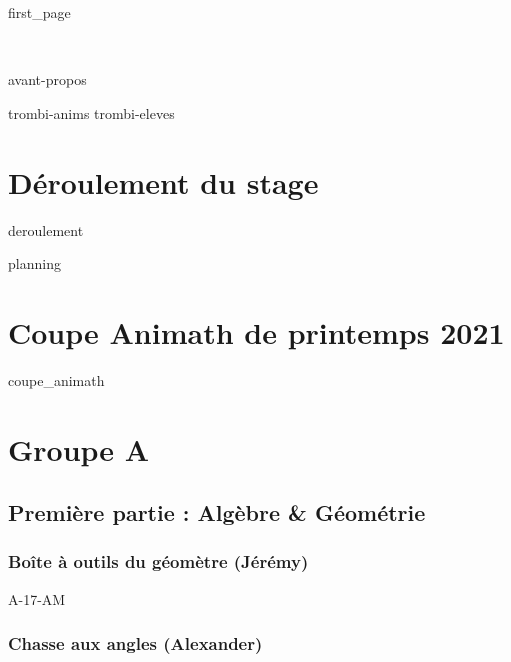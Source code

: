 \documentclass[poly,trombi]{valbonne}
\begin{document}
{first_page}

\pagestyle{empty}~

\pagebreak

\clearpage

{avant-propos}

\pagestyle{plain}

\footnotesize

\newpage
\pagestyle{trombi}
{trombi-anims}
\newpage
{trombi-eleves}


\normalsize

\pagestyle{empty}

\renewcommand{\headrulewidth}{0.4pt}

\tableofcontents

\chapter{Déroulement du stage}
\pagestyle{plain}

{deroulement}

{planning}

\chapter{Coupe Animath de printemps 2021}

{coupe_animath}






\chapter{Groupe A}

\minitoc \clearpage

\section{Première partie : Algèbre \& Géométrie}

\subsection{Boîte à outils du géomètre (Jérémy)}

{A-17-AM}

\subsection{Chasse aux angles (Alexander)}
\end{document}
